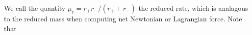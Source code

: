 We call the quantity \(\mu_r = r_+r_-/(r_+ + r_-)\) the reduced rate, which is analagous to the reduced mass when computing net Newtonian or Lagrangian force.  Note that